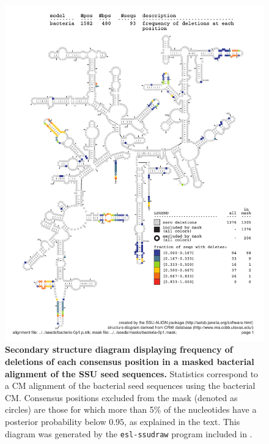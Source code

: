 \begin{figure}
\begin{center}
\includegraphics[width=5.7in]{Figures/bacteria-0p1-dall-wmask}
\end{center}
\caption[Secondary structure diagram displaying frequency of deletions
  of each consensus position in a masked bacterial alignment of the SSU seed
  sequences]{\textbf{Secondary structure diagram displaying frequency of deletions
  of each consensus position in a masked bacterial alignment of the SSU seed
  sequences.} Statistics correspond to a CM alignment of the bacterial
  seed sequences using the  bacterial CM. Consensus positions
  excluded from the mask (denoted as circles) are those for which 
  more than 5\% of the nucleotides have a posterior probability below
  $0.95$, as explained in the text. This diagram was generated by the
  {\tt esl-ssudraw} program included in .}
\label{fig:bacdelmask}
\end{figure}

